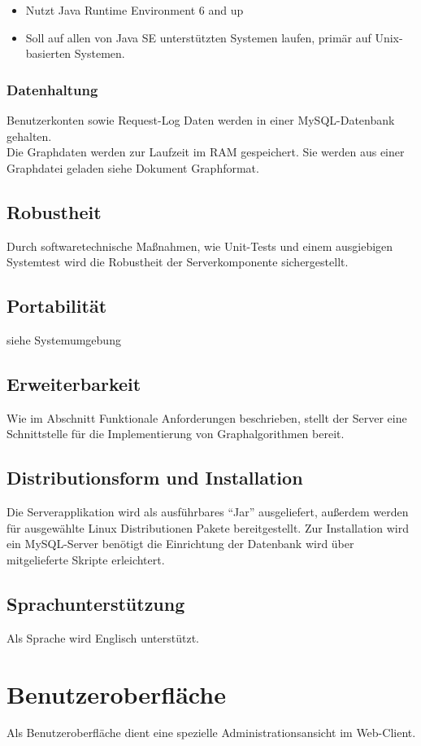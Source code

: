 \documentclass[a4paper,10pt,titlepage]{article}
\begin{document}
\begin {itemize}
 \item Nutzt Java Runtime Environment 6 and up
 \item Soll auf allen von Java SE unterstützten Systemen laufen, primär auf Unix-basierten Systemen.
\end {itemize}
\subsubsection{Datenhaltung}
\label{datenhaltung}
Benutzerkonten sowie Request-Log Daten werden in einer MySQL-Datenbank gehalten.\\
Die Graphdaten werden zur Laufzeit im RAM gespeichert. Sie werden aus einer Graphdatei geladen siehe Dokument Graphformat.

\subsection{Robustheit}
Durch softwaretechnische Maßnahmen, wie Unit-Tests und einem ausgiebigen Systemtest wird die Robustheit der Serverkomponente sichergestellt.
\subsection{Portabilität}
siehe Systemumgebung
\subsection{Erweiterbarkeit}
Wie im Abschnitt Funktionale Anforderungen beschrieben, stellt der Server eine Schnittstelle für die Implementierung von Graphalgorithmen bereit.
\subsection{Distributionsform und Installation}
Die Serverapplikation wird als ausführbares "`Jar"' ausgeliefert, außerdem werden für ausgewählte Linux Distributionen Pakete bereitgestellt. Zur Installation wird ein MySQL-Server benötigt die Einrichtung der Datenbank wird über mitgelieferte Skripte erleichtert.
\subsection{Sprachunterstützung}
Als Sprache wird Englisch unterstützt. 


\clearpage
\section{Benutzeroberfläche}
Als Benutzeroberfläche dient eine spezielle Administrationsansicht im Web-Client.
\end{document}
